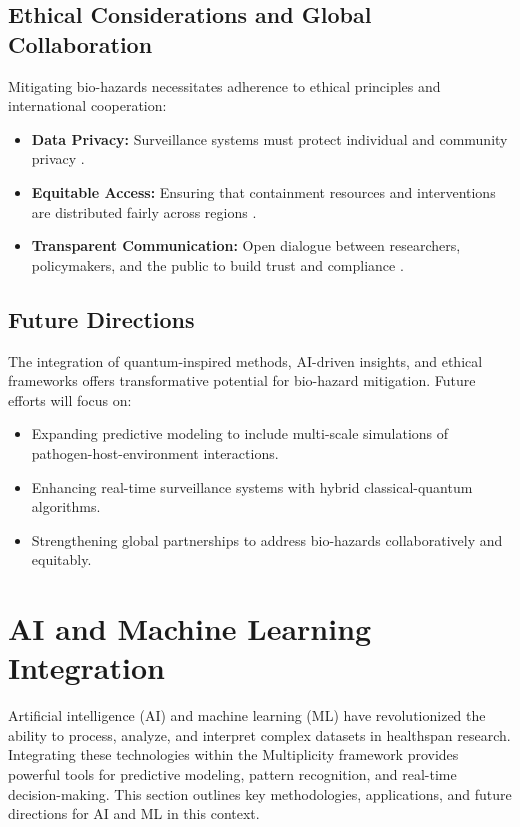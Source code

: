 \documentclass{article}
\theoremstyle{plain}
\begin{document}
\subsection{Ethical Considerations and Global Collaboration}
Mitigating bio-hazards necessitates adherence to ethical principles and international cooperation:
\begin{itemize}
    \item \textbf{Data Privacy:} Surveillance systems must protect individual and community privacy \cite{privacyBioSecurity2022}.
    \item \textbf{Equitable Access:} Ensuring that containment resources and interventions are distributed fairly across regions \cite{globalEquity2023}.
    \item \textbf{Transparent Communication:} Open dialogue between researchers, policymakers, and the public to build trust and compliance \cite{bioEthics2023}.
\end{itemize}

\subsection{Future Directions}
The integration of quantum-inspired methods, AI-driven insights, and ethical frameworks offers transformative potential for bio-hazard mitigation. Future efforts will focus on:
\begin{itemize}
    \item Expanding predictive modeling to include multi-scale simulations of pathogen-host-environment interactions.
    \item Enhancing real-time surveillance systems with hybrid classical-quantum algorithms.
    \item Strengthening global partnerships to address bio-hazards collaboratively and equitably.
\end{itemize}


\section{AI and Machine Learning Integration}
\label{sec:ai_ml_integration}

Artificial intelligence (AI) and machine learning (ML) have revolutionized the ability to process, analyze, and interpret complex datasets in healthspan research. Integrating these technologies within the Multiplicity framework provides powerful tools for predictive modeling, pattern recognition, and real-time decision-making. This section outlines key methodologies, applications, and future directions for AI and ML in this context.
\end{document}
